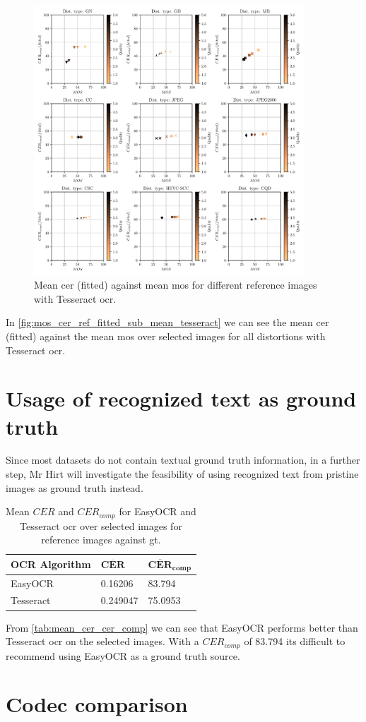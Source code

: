 \begin{figure}[h]
\centering
    \includegraphics[width=0.9\textwidth]{../../images/analyze/mos_cer_ref_fitted_sub_mean_tess.pdf}
    \caption{Mean \gls{cer} (fitted) against mean \gls{mos} for different reference images with Tesseract \gls{ocr}.}
\label{fig:mos_cer_ref_fitted_sub_mean_tesseract}
\end{figure}

In \autoref{fig:mos_cer_ref_fitted_sub_mean_tesseract} we can see the mean \gls{cer} (fitted) against the mean \gls{mos} over selected images for all distortions with Tesseract \gls{ocr}.
    
\section{Usage of recognized text as ground truth}
\label{sec:usage_of_recognized_text_as_ground_truth}

Since most datasets do not contain textual ground truth information,
in a further step, Mr Hirt will investigate the feasibility of
using recognized text from pristine images as ground truth instead.

\begin{table}[h]
\centering
\begin{tabular}{|l|l|l|}
    \hline
    \rule{0em}{1em} \textbf{OCR Algorithm} & $\mathbf{\overline{CER}}$ & $\mathbf{\overline{CER}_{comp}}$ \\
    \hline
    EasyOCR & 0.16206 & 83.794 \\
    \hline
    Tesseract & 0.249047 & 75.0953 \\
    \hline
\end{tabular}
\caption{Mean $CER$ and $CER_{comp}$ for EasyOCR and Tesseract \gls{ocr} over selected images for reference images against \gls{gt}.}
\label{tab:mean_cer_cer_comp}
\end{table}

From \autoref{tab:mean_cer_cer_comp} we can see that EasyOCR performs better than Tesseract \gls{ocr} on the selected images.
With a $CER_{comp}$ of 83.794 its difficult to recommend using EasyOCR as a ground truth source.

\section{Codec comparison}
\label{sec:codec_comparison}
